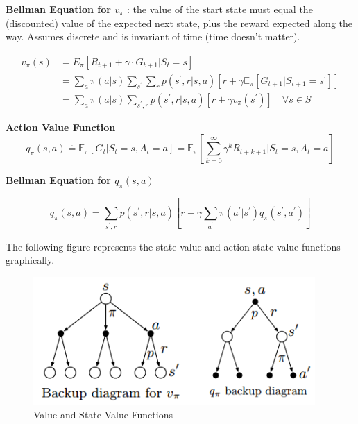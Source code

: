 \documentclass{article}
\begin{document}
\newpage
\noindent
\textbf{Bellman Equation for $v_{\pi}$}
: the value of the start state must equal the
(discounted) value of the expected next state, plus the reward expected along
the way. Assumes discrete and is invariant of time (time doesn't matter).

\begin{equation}
\begin{aligned}
v_{\pi}(s) &= E_{\pi}[R_{t+1}+\gamma \cdot G_{t+1} | S_{t}=s] \\
&= \sum_{a} \pi(a | s) \sum_{s^{\prime}} \sum_{r} p(s^{\prime}, r|s, a)[r+\gamma \mathbb{E}_{\pi}[G_{t+1} | S_{t+1}=s^{\prime}]]\\
&=\sum_{a} \pi(a | s) \sum_{s^{\prime}, r} p\left(s^{\prime}, r | s, a\right)\left[r+\gamma v_{\pi}\left(s^{\prime}\right)\right] \quad \forall s \in S
\end{aligned}
\end{equation}

\noindent
\textbf{Action Value Function}
\begin{equation}
q_{\pi}(s, a) \doteq \mathbb{E}_{\pi}\left[G_{t} | S_{t}=s, A_{t}=a\right]=\mathbb{E}_{\pi}\left[\sum_{k=0}^{\infty} \gamma^{k} R_{t+k+1} | S_{t}=s, A_{t}=a\right]
\end{equation}

\noindent
\textbf{Bellman Equation for $q_{\pi}(s, a)$}

\begin{equation}
q_{\pi}(s, a)=\sum_{s^{\prime}, r} p\left(s^{\prime}, r | s, a\right)\left[r+\gamma \sum_{a^{\prime}} \pi\left(a^{\prime} | s^{\prime}\right) q_{\pi}\left(s^{\prime}, a^{\prime}\right)\right]
\end{equation}

\noindent
The following figure represents the state value and action state value functions
graphically.

\begin{figure}[h]
\includegraphics[scale=0.5]{value_functions}
\centering
\caption{Value and State-Value Functions}
\end{figure}
\end{document}
